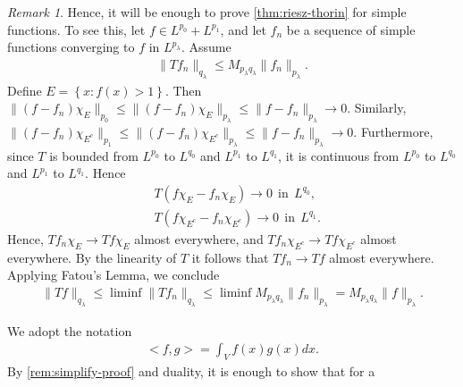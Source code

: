\documentclass[12pt,reqno]{amsart}
\numberwithin{equation}{section}  %
\numberwithin{figure}{section}
\theoremstyle{plain}
\theoremstyle{definition}
\theoremstyle{remark}
\newtheorem{remark}{Remark}
\begin{document}
\begin{framed}
\begin{remark}
\label{rem:simplify-proof}
Hence, it will be enough to prove \autoref{thm:riesz-thorin} for simple
functions. To see this, let $f \in L^{p_0} + L^{p_1}$, and let $f_n$ be a
sequence of simple functions converging to $f$ in $L^{p_\lambda}$. Assume
%
%
\begin{equation*}
	\begin{split}
		\| Tf_{n} \|_{q_\lambda} \le M_{p_\lambda q_\lambda} \| f_n \|_{p_\lambda}.
	\end{split}
\end{equation*}
%
%
Define $E = \left\{ x: f(x) >1 \right\}$. Then $\|(f -f_n)\chi_{E}\|_{p_0} \le
\| (f - f_n) \chi_{E} \|_{p_\lambda} \le \| f -f_n \|_{p_\lambda} \to 0$. Similarly,
$\|(f -f_n) \chi_{E^c}\|_{p_1} \le  \|(f -f_n) \chi_{E^c} \|_{p_\lambda} \le \|f -f_n
\|_{p_\lambda} \to 0$. Furthermore, since $T$ is bounded from $L^{p_0}$ to
$L^{q_0}$ and $L^{p_1}$ to $L^{q_1}$, it is continuous from $L^{p_0}$ to
$L^{q_0}$ and $L^{p_1}$ to $L^{q_1}$. Hence
%
%
\begin{equation*}
	\begin{split}
		& T(f\chi_{E} - f_n \chi_{E}) \to 0  \ \ \text{in} \ \ L^{q_0},
		\\
		&  T(f\chi_{E^c} - f_n \chi_{E^c}) \to 0 \ \ \text{in} \ \ L^{q_1}.
	\end{split}
\end{equation*}
%
%
Hence, $Tf_n \chi_{E} \to Tf \chi_{E}$ almost everywhere, and $Tf_n
\chi_{E^c} \to Tf \chi_{E^c}$ almost everywhere. By the linearity of
$T$ it follows that $Tf_n \to Tf$ almost
everywhere. Applying Fatou's Lemma, we conclude
%
%
%
%
\begin{equation*}
	\begin{split}
		\|Tf\|_{q_\lambda} \le \liminf \| Tf_n \|_{q_\lambda} \le \liminf M_{p_\lambda q_\lambda} \| f_n
		\|_{p_\lambda} = M_{p_\lambda q_\lambda} \| f \|_{p_\lambda}.
	\end{split}
\end{equation*}
\end{remark}
\end{framed}
%
%
We adopt the notation
%
%
\begin{equation*}
\begin{split}
<f, g> = \int_{V}f(x)g(x)dx.
\end{split}
\end{equation*}
%
%
By \autoref{rem:simplify-proof} and duality, it is enough to show that for a
\end{document}
